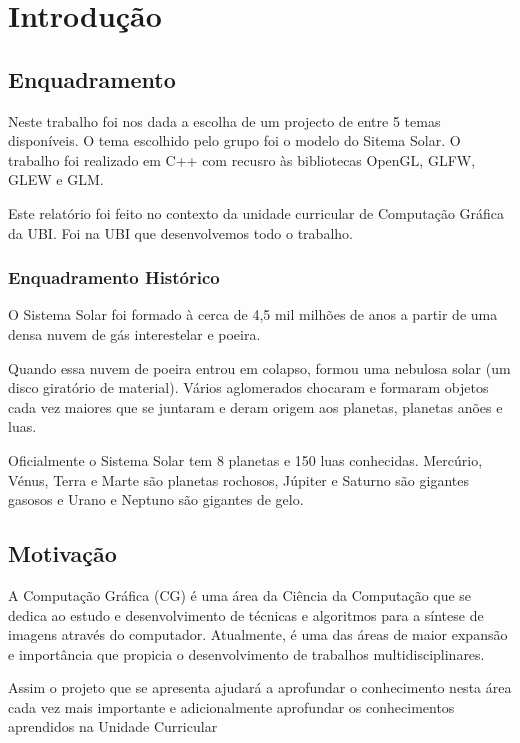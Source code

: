\chapter{Introdução}
\label{chap:intro}

\section{Enquadramento}
\label{sec:amb} %

Neste trabalho foi nos dada a escolha de um projecto de entre 5 temas disponíveis. O tema escolhido pelo grupo foi o  modelo do Sitema Solar. O trabalho foi realizado em C++ com recusro às bibliotecas \ac{OpenGL}, \ac{GLFW}, \ac{GLEW} e \ac{GLM}.

Este relatório foi feito no contexto da unidade curricular de Computação Gráfica da \ac{UBI}. Foi na \ac{UBI} que desenvolvemos todo o trabalho. 

\subsection{Enquadramento Histórico}
O Sistema Solar foi formado à cerca de 4,5 mil milhões de anos a partir de uma densa nuvem de gás interestelar e poeira.

Quando essa nuvem de poeira entrou em colapso, formou uma nebulosa solar (um disco giratório de material).
Vários aglomerados chocaram e formaram objetos cada vez maiores que se juntaram e deram origem aos planetas, planetas anões e luas.

Oficialmente o Sistema Solar tem 8 planetas e 150 luas conhecidas. Mercúrio, Vénus, Terra e Marte são planetas rochosos, Júpiter e Saturno são gigantes gasosos e Urano e Neptuno são gigantes de gelo.

\section{Motivação}
\label{sec:mot}

A Computação Gráfica (CG) é uma área da Ciência da Computação que se dedica
ao estudo e desenvolvimento de técnicas e algoritmos para a síntese de imagens através do computador. Atualmente, é uma das áreas de maior expansão e importância que propicia o desenvolvimento de trabalhos multidisciplinares.

Assim o projeto que se apresenta ajudará a aprofundar o conhecimento nesta área cada vez mais importante e adicionalmente aprofundar os conhecimentos aprendidos na Unidade Curricular

